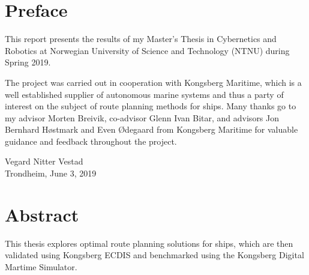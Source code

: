 \chapter*{Preface}

This report presents the results of my Master's Thesis in Cybernetics and Robotics at Norwegian University of Science and Technology (NTNU) during Spring 2019. 

The project was carried out in cooperation with Kongsberg Maritime, which is a well established supplier of autonomous marine systems and thus a party of interest on the subject of route planning methods for ships. Many thanks go to my advisor Morten Breivik, co-advisor Glenn Ivan Bitar, and advisors Jon Bernhard Høstmark and Even Ødegaard from Kongsberg Maritime for valuable guidance and feedback throughout the project.



\begin{center}
\large Vegard Nitter Vestad \\
\large Trondheim, June 3, 2019
\end{center}

\newpage
{} \chapter*{Abstract}

This thesis explores optimal route planning solutions for ships, which are then validated using Kongsberg ECDIS and benchmarked using the  Kongsberg Digital Martime Simulator.



\newpage
\tableofcontents

\newpage
\listoffigures

\newpage
\listoftables

\newpage
{} \printglossary[type=\acronymtype,title=Abbreviations]

\newpage
{} \printglossary[title=Nomenclature]
 
\newpage
\setcounter{page}{1}
